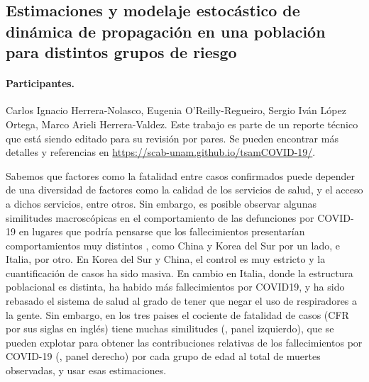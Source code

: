 
\subsection*{Estimaciones y modelaje estocástico de dinámica de propagación en una población para distintos grupos de riesgo}

\paragraph{Participantes.} Carlos Ignacio Herrera-Nolasco, Eugenia O'Reilly-Regueiro, Sergio Iván López Ortega, Marco Arieli Herrera-Valdez. Este trabajo es parte de un reporte técnico que está siendo editado para su revisión por pares. Se pueden encontrar más detalles y referencias en \url{https://scab-unam.github.io/tsamCOVID-19/}.  

\bigskip
Sabemos que factores como la fatalidad entre casos confirmados puede depender de una diversidad de factores como la calidad de los servicios de salud, y el acceso a dichos servicios, entre otros. 
Sin embargo, es posible observar algunas similitudes macroscópicas en el comportamiento de las defunciones por COVID-19 en lugares que podría pensarse que los fallecimientos presentarían comportamientos muy distintos , como China y Korea del Sur por un lado, e Italia, por otro. 
En Korea del Sur y China, el control es muy estricto y la cuantificación de casos ha sido masiva. 
En cambio en Italia, donde la estructura poblacional es distinta, ha habido más fallecimientos por COVID19, y ha sido rebasado el sistema de salud al grado de tener que negar el uso de respiradores a la gente. 
Sin embargo, en los tres paises el cociente de fatalidad de casos (CFR por sus siglas en inglés) tiene muchas similitudes (, panel izquierdo), que se pueden explotar para obtener las contribuciones relativas de los fallecimientos por COVID-19 (, panel derecho) por cada grupo de edad al total de muertes observadas, y usar esas estimaciones. 

